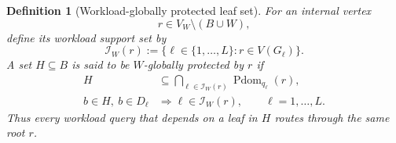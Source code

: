 \documentclass[journal]{IEEEtran}
\newtheorem{definition}{Definition}[section]
\numberwithin{equation}{section}
\begin{document}
\begin{definition}[Workload-globally protected leaf set]
\label{def:workload-global-protection}
For an internal vertex
\[
  r\in V_W\setminus(B\cup W),
\]
define its workload support set by
\begin{equation}
  \mathcal I_W(r)
  :=
  \{\ell\in\{1,\ldots,L\}: r\in V(G_\ell)\}.
\label{eq:def-workload-support}
\end{equation}
A set \(H\subseteq B\) is said to be \emph{\(W\)-globally protected by \(r\)}
if
\begin{align}
  H
  &\subseteq
  \bigcap_{\ell\in\mathcal I_W(r)}
  \operatorname{Pdom}_{q_\ell}(r),
\label{eq:global-protected-local}\\
  b\in H,\ b\in D_\ell
  &\Longrightarrow
  \ell\in\mathcal I_W(r),
  \qquad \ell=1,\ldots,L.
\label{eq:global-protected-workload}
\end{align}
Thus every workload query that depends on a leaf in \(H\) routes through the
same root \(r\).
\end{definition}
\end{document}
